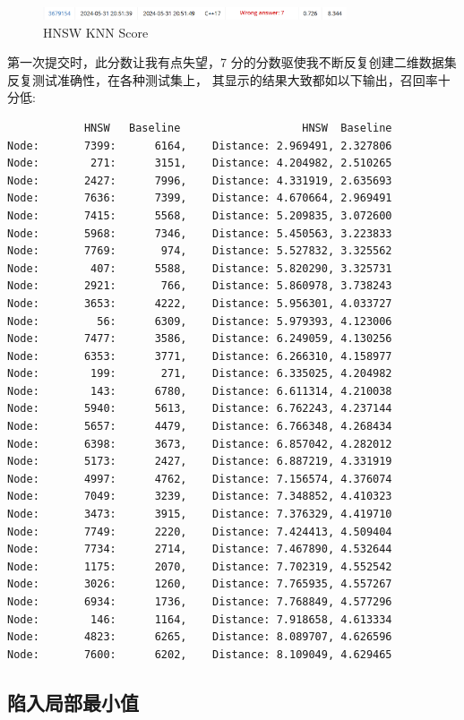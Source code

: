 \begin{figure}[H]
    \centering
    \includegraphics[width=0.8\textwidth]{img/hnsw-knn-score}
    \caption{HNSW KNN Score}
\end{figure}

第一次提交时，此分数让我有点失望，7 分的分数驱使我不断反复创建二维数据集反复测试准确性，在各种测试集上，
其显示的结果大致都如以下输出，召回率十分低:

\begin{verbatim}
            HNSW   Baseline                   HNSW  Baseline
Node:       7399:      6164, 	Distance: 2.969491, 2.327806
Node:        271:      3151, 	Distance: 4.204982, 2.510265
Node:       2427:      7996, 	Distance: 4.331919, 2.635693
Node:       7636:      7399, 	Distance: 4.670664, 2.969491
Node:       7415:      5568, 	Distance: 5.209835, 3.072600
Node:       5968:      7346, 	Distance: 5.450563, 3.223833
Node:       7769:       974, 	Distance: 5.527832, 3.325562
Node:        407:      5588, 	Distance: 5.820290, 3.325731
Node:       2921:       766, 	Distance: 5.860978, 3.738243
Node:       3653:      4222, 	Distance: 5.956301, 4.033727
Node:         56:      6309, 	Distance: 5.979393, 4.123006
Node:       7477:      3586, 	Distance: 6.249059, 4.130256
Node:       6353:      3771, 	Distance: 6.266310, 4.158977
Node:        199:       271, 	Distance: 6.335025, 4.204982
Node:        143:      6780, 	Distance: 6.611314, 4.210038
Node:       5940:      5613, 	Distance: 6.762243, 4.237144
Node:       5657:      4479, 	Distance: 6.766348, 4.268434
Node:       6398:      3673, 	Distance: 6.857042, 4.282012
Node:       5173:      2427, 	Distance: 6.887219, 4.331919
Node:       4997:      4762, 	Distance: 7.156574, 4.376074
Node:       7049:      3239, 	Distance: 7.348852, 4.410323
Node:       3473:      3915, 	Distance: 7.376329, 4.419710
Node:       7749:      2220, 	Distance: 7.424413, 4.509404
Node:       7734:      2714, 	Distance: 7.467890, 4.532644
Node:       1175:      2070, 	Distance: 7.702319, 4.552542
Node:       3026:      1260, 	Distance: 7.765935, 4.557267
Node:       6934:      1736, 	Distance: 7.768849, 4.577296
Node:        146:      1164, 	Distance: 7.918658, 4.613334
Node:       4823:      6265, 	Distance: 8.089707, 4.626596
Node:       7600:      6202, 	Distance: 8.109049, 4.629465
\end{verbatim}

\subsection{陷入局部最小值}

